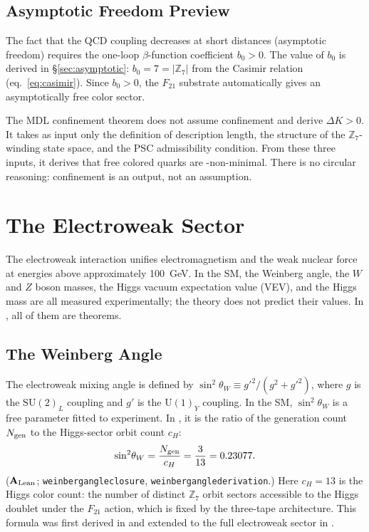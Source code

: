 \documentclass[11pt,openany]{book}
\theoremstyle{remark}
\newcommand{\GTE}{\text{GTE}}
\newcommand{\MDL}{\text{MDL}}
\newcommand{\PSC}{\text{PSC}}
\newcommand{\ZS}{\mathbb{Z}_7}
\newcommand{\lean}[1]{%
  \penalty-100
  \begingroup\def\_{\textunderscore\allowbreak}\texttt{#1}\endgroup}
\newcommand{\Ngen}{N_{\rm gen}}
\newcommand{\sigW}{\sin^2\!\theta_W}
\newcommand{\CatAL}{\ensuremath{\textbf{A}_{\rm Lean}}}
\begin{document}
\subsection*{Asymptotic Freedom Preview}

The fact that the QCD coupling decreases at short distances (asymptotic freedom) requires
the one-loop $\beta$-function coefficient $b_0 > 0$.  The value of $b_0$ is derived in
\S\ref{sec:asymptotic}: $b_0 = 7 = |\ZS|$ from the Casimir relation
(eq.~\eqref{eq:casimir}).  Since $b_0 > 0$, the $F_{21}$ substrate automatically gives an
asymptotically free color sector.

\begin{tcolorbox}[colback=yellow!8,colframe=yellow!60!black,title={Why This Is Not a Circular Argument}]
The $\MDL$ confinement theorem does not assume confinement and derive $\Delta K > 0$.
It takes as input only the definition of \MDL{} description length, the structure of the
$\ZS$-winding state space, and the $\PSC$ admissibility condition.  From these three
inputs, it derives that free colored quarks are \MDL-non-minimal.  There is no circular
reasoning: confinement is an output, not an assumption.
\end{tcolorbox}

\section{The Electroweak Sector}
\label{sec:ew}

The electroweak interaction unifies electromagnetism and the weak nuclear force at energies
above approximately 100~GeV.  In the SM, the Weinberg angle, the $W$ and $Z$ boson masses,
the Higgs vacuum expectation value (VEV), and the Higgs mass are all measured
experimentally; the theory does not predict their values.  In \GTE{}, all of them are
theorems.

\subsection*{The Weinberg Angle}

The electroweak mixing angle is defined by $\sigW \equiv g'^2 / (g^2 + g'^2)$, where $g$
is the $\mathrm{SU}(2)_L$ coupling and $g'$ is the $\mathrm{U}(1)_Y$ coupling.  In the
SM, $\sigW$ is a free parameter fitted to experiment.  In \GTE{}, it is the ratio of the
generation count $\Ngen$ to the Higgs-sector orbit count $c_H$:
\begin{equation}
  \sigW = \frac{\Ngen}{c_H} = \frac{3}{13} = 0.23077.
  \label{eq:weinberg_angle}
\end{equation}
\noindent(\CatAL;\;\lean{weinberg\_angle\_closure}, \lean{weinberg\_angle\_derivation}.)
Here $c_H = 13$ is the Higgs color count: the number of distinct $\ZS$ orbit sectors
accessible to the Higgs doublet under the $F_{21}$ action, which is fixed by the
three-tape architecture.  This formula was first derived in \cite{SpivackWeinbergAngle}
and extended to the full electroweak sector in \cite{SpivackGTEUnification}.
\end{document}
